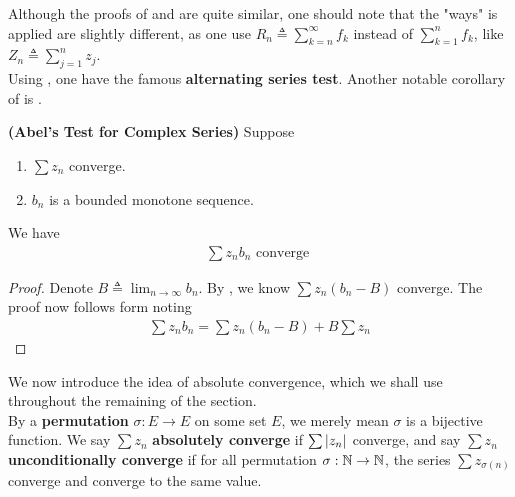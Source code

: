 \documentclass{report}
\begin{document}
\begin{mdframed}
Although the proofs of  and  are quite similar, one should note that the "ways"  is applied are slightly different, as one use $R_n\triangleq \sum_{k=n}^{\infty}f_k$ instead of $\sum_{k=1}^n f_k$, like $Z_n\triangleq \sum_{j=1}^n z_j$. \\

Using , one have the famous \textbf{alternating series test}. Another notable corollary of  is . 
\end{mdframed}
\begin{theorem}
\label{Abel's Test for Complex Series}
\textbf{(Abel's Test for Complex Series)} Suppose 
\begin{enumerate}[label=(\alph*)]
  \item $\sum z_n$ converge. 
  \item $b_n$ is a bounded monotone sequence.
\end{enumerate}
We have 
\begin{align*}
\sum z_nb_n\text{ converge }
\end{align*}
\end{theorem}
\begin{proof}
Denote $B\triangleq \lim_{n\to \infty}b_n$. By , we know $\sum z_n(b_n-B)$ converge. The proof now follows form noting 
\begin{align*}
\sum z_nb_n= \sum z_n(b_n-B)+ B \sum  z_n
\end{align*}
\end{proof}
\begin{mdframed}
We now introduce the idea of absolute convergence, which we shall use throughout the remaining of the section.\\

By a \textbf{permutation} $\sigma:E\rightarrow E$ on some set $E$, we merely mean  $\sigma$ is a bijective function. We say $\sum z_n$ \textbf{absolutely converge} if $\sum \left|z_n\right|$ converge, and say $\sum z_n$ \textbf{unconditionally converge} if for all permutation $\sigma:\mathbb{N}\rightarrow \mathbb{N}$, the series $\sum z_{\sigma (n)}$ converge and converge to the same value.
\end{mdframed}
\end{document}

